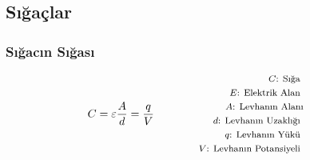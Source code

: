 \subsection{Sığaçlar}

\subsubsection*{Sığacın Sığası}
\begin{equation}
    C = \varepsilon \frac{A}{d} = \frac{q}{V} \qquad \qquad \parbox{4cm}{\footnotesize$\begin{aligned}
        C\text{: Sığa } \\
        E\text{: Elektrik Alan } \\
        A\text{: Levhanın Alanı} \\
        d\text{: Levhanın Uzaklığı } \\
        q\text{: Levhanın Yükü } \\
        V\text{: Levhanın Potansiyeli }
\end{aligned}$}
\end{equation}
